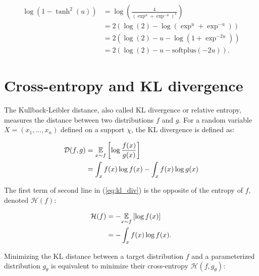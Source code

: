 \begin{equation}
\label{eq:logprob_openai}
\begin{aligned}
	\log \left( 1 - \tanh^2(u) \right) 	&= \log \left( \frac{4}{\left(\exp^u + \exp^{-u}\right)^2} \right)\\
							&= 2 \left( \log(2) - \log \left( \exp^u + \exp^{-u} \right) \right)\\
							&= 2 \left( \log(2) - u - \log \left( 1 + \exp^{-2u} \right) \right)\\
							&= 2 \left( \log(2) - u - \text{softplus} (-2u) \right).
\end{aligned}
\end{equation}

\section{Cross-entropy and KL divergence}

The Kullback-Leibler distance, also called KL divergence or relative entropy, measures the distance between two distributions $f$ and $g$. For a random variable $X = (x_1, ..., x_n)$ defined on a support $\chi$, the KL divergence is defined as:

\begin{equation}
\label{eq:kl_div}
\begin{aligned}
	\mathcal{D}(f,g) 	&= \underset{x \sim f}{\mathbb{E}} \left[ \log \frac{f(x)}{g(x)} \right]\\
					&= \int_{x} f(x) \log f(x) - \int_{x} f(x) \log g(x)
\end{aligned}
\end{equation}

The first term of second line in (\ref{eq:kl_div}) is the opposite of the entropy of $f$, denoted $\mathcal{H}(f)$:

\begin{equation}
\label{eq:entropy}
\begin{aligned}
	\mathcal{H}(f) 	&= - \underset{x \sim f}{\mathbb{E}} \left[ \log f(x) \right]\\
				&= - \int_{x} f(x) \log f(x).
\end{aligned}
\end{equation}

Minimizing the KL distance between a target distribution $f$ and a parameterized distribution $g_\theta$ is equivalent to minimize their cross-entropy $\mathcal{H} (f,g_\theta)$:

